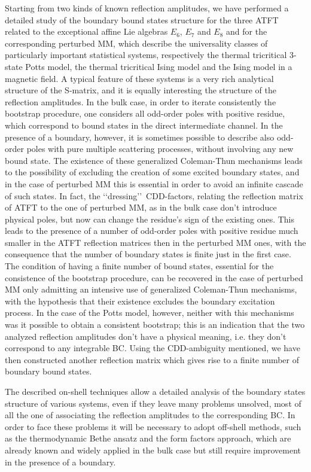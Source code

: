\documentclass[a4paper,12pt]{report}
\begin{document}
Starting from two kinds of known reflection amplitudes, we have performed a detailed study of the boundary bound
states structure for the three ATFT related to the exceptional affine Lie algebras $E_{6}$, $E_{7}$ and $E_{8}$
and for the corresponding perturbed MM, which describe the universality classes of particularly important
statistical systems, respectively the thermal tricritical 3-state Potts model, the thermal tricritical Ising
model and the Ising model in a magnetic field. A typical feature of these systems is a very rich analytical
structure of the S-matrix, and it is equally interesting the structure of the reflection amplitudes. In the bulk
case, in order to iterate consistently the bootstrap procedure, one considers all odd-order poles with positive
residue, which correspond to bound states in the direct intermediate channel. In the presence of a boundary,
however, it is sometimes possible to describe also odd-order poles with pure multiple scattering processes,
without involving any new bound state. The existence of these generalized Coleman-Thun mechanisms leads to the
possibility of excluding the creation of some excited boundary states, and in the case of perturbed MM this is
essential in order to avoid an infinite cascade of such states. In fact, the \lq\lq dressing\rq\rq \,
CDD-factors, relating the reflection matrix of ATFT to the one of perturbed MM, as in the bulk case don't
introduce physical poles, but now can change the residue's sign of the existing ones. This leads to the presence
of a number of odd-order poles with positive residue much smaller in the ATFT reflection matrices then in the
perturbed MM ones, with the consequence that the number of boundary states is finite just in the first case. The
condition of having a finite number of bound states, essential for the consistence of the bootstrap procedure,
can be recovered in the case of perturbed MM only admitting an intensive use of generalized Coleman-Thun
mechanisms, with the hypothesis that their existence excludes the boundary excitation process. In the case of the
Potts model, however, neither with this mechanisms was it possible to obtain a consistent bootstrap; this is an
indication that the two analyzed reflection amplitudes don't have a physical meaning, i.e. they don't correspond
to any integrable BC. Using the CDD-ambiguity mentioned, we have then constructed another reflection matrix which
gives rise to a finite number of boundary bound states.

The described on-shell techniques allow a detailed analysis of the boundary states structure of various systems,
even if they leave many problems unsolved, most of all the one of associating the reflection amplitudes to the
corresponding BC. In order to face these problems it will be necessary to adopt off-shell methods, such as the
thermodynamic Bethe ansatz and the form factors approach, which are already known and widely applied in the bulk
case but still require improvement in the presence of a boundary.
\end{document}
